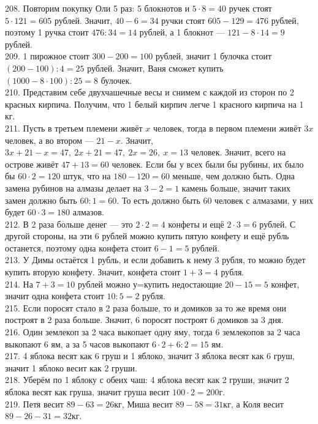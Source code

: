 \documentclass[12pt]{article}
\begin{document}
208. Повторим покупку Оли 5 раз: 5 блокнотов и $5\cdot8=40$ ручек стоят $5\cdot121=605$ рублей. Значит, $40-6=34$ ручки стоят $605-129=476$ рублей, поэтому 1 ручка стоит $476:34=14$ рублей, а 1 блокнот --- $121-8\cdot14=9$ рублей.\\
209. 1 пирожное стоит $300-200=100$ рублей, значит 1 булочка стоит $(200-100):4=25$ рублей. Значит, Ваня сможет купить $(1000-8\cdot100):25=8$ булочек.\\
210. Представим себе двухчашечные весы и снимем с каждой из сторон по 2 красных кирпича. Получим, что 1 белый кирпич легче 1 красного кирпича на 1 кг.\\
211. Пусть в третьем племени живёт $x$ человек, тогда в первом племени живёт $3x$ человек, а во втором --- $21-x.$ Значит, $3x+21-x=47,\ 2x+21=47,\ 2x=26,\ x=13$ человек. Значит, всего на острове живёт $47+13=60$ человек. Если бы у всех были бы рубины, их было бы $60\cdot2=120$ штук, что на $180-120=60$ меньше, чем должно быть. Одна замена рубинов на алмазы делает на $3-2=1$ камень больше, значит таких замен должно быть $60:1=60.$ То есть должно быть 60 человек с алмазами, у них будет $60\cdot3=180$ алмазов.\\
212. В 2 раза больше денег --- это $2\cdot2=4$ конфеты и ещё $2\cdot3=6$ рублей. С другой стороны, на эти 6 рублей можно купить пятую конфету и ещё рубль останется, поэтому одна конфета стоит $6-1=5$ рублей.\\
213. У Димы остаётся 1 рубль, и если добавить к нему 3 рубля, то можно будет купить вторую конфету. Значит, конфета стоит $1+3=4$ рубля.\\
214. На $7+3=10$ рублей можно у=купить недостающие  $20-15=5$ конфет, значит одна конфета стоит $10:5=2$ рубля.\\
215. Если поросят стало в 2 раза больше, то и домиков за то же время они построят в 2 раза больше. Значит, 6 поросят построят 6 домиков за 3 дня.\\
216. Один землекоп за 2 часа выкопает одну яму, тогда 6 землекопов за 2 часа выкопают 6 ям, а за 5 часов выкопают $6\cdot2+6:2=15$ ям.\\
217. 4 яблока весят как 6 груш и 1 яблоко, значит 3 яблока весят как 6 груш, значит 1 яблоко весит как 2 груши.\\
218. Уберём по 1 яблоку с обеих чаш: 4 яблока весят как 2 груши, значит 2 яблока весят как груша, значит груша весит $100\cdot2=200$г.\\
219. Петя весит $89-63=26$кг, Миша весит $89-58=31$кг, а Коля весит $89-26-31=32$кг.\\
\end{document}
